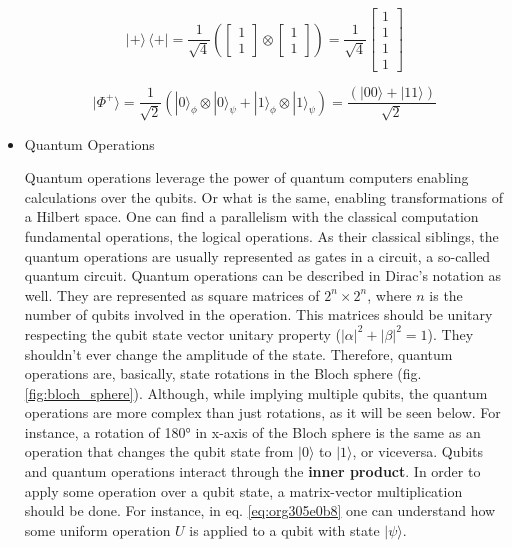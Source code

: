 \begin{itemize}
\begin{equation}
\label{eq:org4834b75}
|+\rangle \,\langle + | = \frac{1}{\sqrt{4}} \left( \begin{bmatrix}1 \\ 1 \end{bmatrix} \otimes \begin{bmatrix}1 \\ 1 \end{bmatrix} \right) = \frac{1}{\sqrt{4}} \begin{bmatrix}1 \\ 1 \\ 1 \\ 1\end{bmatrix} 
\end{equation}

\begin{equation}
\label{eq:org1f95ab3}
|\Phi ^{+}\rangle =\frac  {1}{\sqrt  {2}}(|0\rangle _{\phi}\otimes |0\rangle _{\psi}+|1\rangle _{\phi}\otimes |1\rangle _{\psi}) =  \frac{(|00\rangle +|11\rangle )} {\sqrt {2}}
\end{equation}


\item Quantum Operations
\label{sec:org8355ce1}

Quantum operations leverage the power of quantum computers enabling calculations over the qubits.
Or what is the same, enabling transformations of a Hilbert space.
One can find a parallelism with the classical computation fundamental operations, the logical operations.
As their classical siblings, the quantum operations are usually represented as gates in a circuit, a so-called quantum circuit.
Quantum operations can be described in Dirac's notation as well.
They are represented as square matrices of \(2^{n} \times 2^{n}\), where \(n\) is the number of qubits involved in the operation.
This matrices should be unitary respecting the qubit state vector unitary property (\(|\alpha|^2 + |\beta|^2 = 1\)).
They shouldn't ever change the amplitude of the state.
Therefore, quantum operations are, basically, state rotations in the Bloch sphere (fig. \ref{fig:bloch_sphere}).
Although, while implying multiple qubits, the quantum operations are more complex than just rotations, as it will be seen below.
For instance, a rotation of 180° in x-axis of the Bloch sphere is the same as an operation that changes the qubit state from \(| 0 \rangle\) to \(| 1 \rangle\), or viceversa.
Qubits and quantum operations interact through the \textbf{inner product}.
In order to apply some operation over a qubit state, a matrix-vector multiplication should be done.
For instance, in eq. \ref{eq:org305e0b8} one can understand how some uniform operation \(U\) is applied to a qubit with state \(| \psi \rangle\).


\end{itemize}
